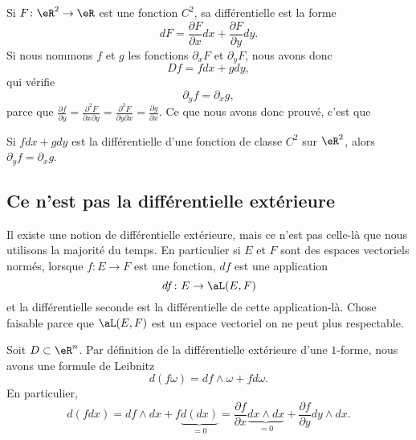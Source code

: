 \begin{example}
	Si \( F\colon \eR^2\to \eR\) est une fonction \( C^2\), sa différentielle est la forme
	\begin{equation}
		dF=\frac{ \partial F }{ \partial x }dx+\frac{ \partial F }{ \partial y }dy.
	\end{equation}
	Si nous nommons \( f\) et \( g\) les fonctions \( \partial_xF\) et \( \partial_yF\), nous avons donc
	\begin{equation}
		Df=fdx+gdy,
	\end{equation}
	qui vérifie
	\begin{equation}
		\partial_yf=\partial_xg,
	\end{equation}
	parce que \( \frac{ \partial f }{ \partial y }=\frac{ \partial^2F  }{ \partial x\partial y }=\frac{ \partial^2F  }{ \partial y\partial x }=\frac{ \partial g }{ \partial x }\). Ce que nous avons donc prouvé, c'est que
\end{example}

\begin{lemma}
	Si \( fdx+gdy\) est la différentielle d'une fonction de classe \( C^2\) sur \( \eR^2\), alors \( \partial_yf=\partial_xg\).
\end{lemma}

\subsection{Ce n'est pas la différentielle extérieure}

Il existe une notion de différentielle extérieure, mais ce n'est pas celle-là que nous utilisons la majorité du temps. En particulier si \( E\) et \( F\) sont des espaces vectoriels normés, lorsque \( f\colon E\to F\) est une fonction, \( df\) est une application
\begin{equation}
	df\colon E\to \aL(E,F)
\end{equation}
et la différentielle seconde est la différentielle de cette application-là. Chose faisable parce que \( \aL(E,F)\) est un espace vectoriel on ne peut plus respectable.

Soit \( D\subset\eR^n\). Par définition de la différentielle extérieure d'une \( 1\)-forme, nous avons une formule de Leibnitz
\begin{equation}
	d(f\omega)=df\wedge\omega+fd\omega.
\end{equation}
En particulier,
\begin{equation}
	d(fdx)=df\wedge dx+f\underbrace{d(dx)}_{=0}=\frac{ \partial f }{ \partial x }\underbrace{dx\wedge dx}_{=0}+\frac{ \partial f }{ \partial y }dy\wedge dx.
\end{equation}


